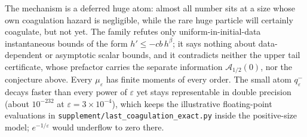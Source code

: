 \begin{remark}
The mechanism is a deferred huge atom: almost all number sits at a
size whose own coagulation hazard is negligible, while the rare huge
particle will certainly coagulate, but not yet. The family refutes
only uniform-in-initial-data instantaneous bounds of the form
$h'\leq-cb\,h^\beta$; it says nothing about data-dependent or
asymptotic scalar bounds, and it contradicts neither the upper tail
certificate, whose prefactor carries the separate information
$\mathcal A_{1/2}(0)$, nor the conjecture above. Every
$\mu_\varepsilon$ has finite moments of every order. The small atom
$q^-_\varepsilon$ decays faster than every power of $\varepsilon$ yet
stays representable in double precision (about $10^{-232}$ at
$\varepsilon=3\times10^{-4}$), which keeps the illustrative
floating-point evaluations in
\texttt{supplement/last\_coagulation\_exact.py} inside the
positive-size model; $e^{-1/\varepsilon}$ would underflow to zero
there.
\end{remark}
